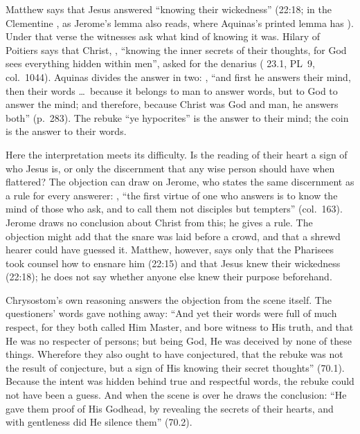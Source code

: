 Matthew says that Jesus answered ``knowing their wickedness'' (22:18; in the
Clementine , as Jerome's lemma also
reads, where Aquinas's printed lemma has ). Under that verse
the witnesses ask what kind of knowing it was. Hilary of Poitiers says that Christ,
, ``knowing the inner secrets of their
thoughts, for God sees everything hidden within men'', asked for the denarius
( 23.1, PL~9, col.~1044). Aquinas divides the
answer in two: , ``and first
he answers their mind, then their words \ldots\ because it belongs to man to
answer words, but to God to answer the mind; and therefore, because Christ was
God and man, he answers both'' (p.~283). The rebuke ``ye hypocrites'' is the
answer to their mind; the coin is the answer to their words.

Here the interpretation meets its difficulty. Is the reading of their heart a
sign of who Jesus is, or only the discernment that any wise person should have
when flattered? The objection can draw on Jerome, who states the same
discernment as a rule for every answerer: , ``the first virtue of one who answers is to know the mind
of those who ask, and to call them not disciples but tempters'' (col.~163).
Jerome draws no conclusion about Christ from this; he gives a rule. The
objection might add that the snare was laid before a crowd, and that a shrewd
hearer could have guessed it. Matthew, however, says only that the Pharisees
took counsel how to ensnare him (22:15) and that Jesus knew their wickedness
(22:18); he does not say whether anyone else knew their purpose beforehand.

Chrysostom's own reasoning answers the objection from the scene itself. The
questioners' words gave nothing away: ``And yet their words were full of much
respect, for they both called Him Master, and bore witness to His truth, and
that He was no respecter of persons; but being God, He was deceived by none of
these things. Wherefore they also ought to have conjectured, that the rebuke
was not the result of conjecture, but a sign of His knowing their secret
thoughts'' (70.1). Because the intent was hidden behind true and respectful
words, the rebuke could not have been a guess. And when the scene is over he
draws the conclusion: ``He gave them proof of His Godhead, by revealing the
secrets of their hearts, and with gentleness did He silence them'' (70.2).


